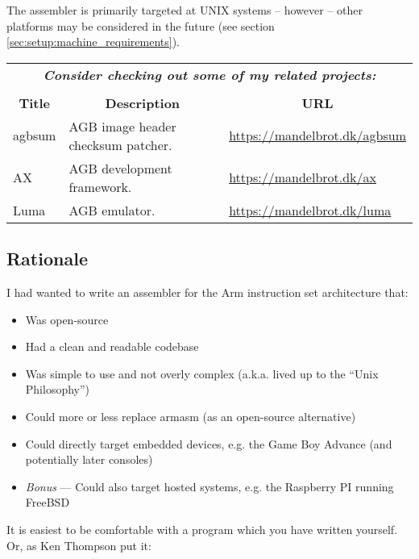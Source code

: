 \documentclass[a4paper]{article}
\begin{document}
		The assembler is primarily targeted at UNIX systems -- however -- other platforms may be considered in the future (see section \ref{sec:setup:machine_requirements}).

		\begin{center}
			\begin{tabular}{|l|l|l|}
				\multicolumn{3}{c}{\itshape\bfseries Consider checking out some of my related projects:} \\
				\multicolumn{3}{c}{} \\
				\hline
				\multicolumn{1}{|c|}{\bfseries Title} & \multicolumn{1}{c|}{\bfseries Description} & \multicolumn{1}{c|}{\bfseries URL} \\
				agbsum & AGB image header checksum patcher. & \url{https://mandelbrot.dk/agbsum} \\
				AX & AGB development framework. & \url{https://mandelbrot.dk/ax} \\
				Luma & AGB emulator. & \url{https://mandelbrot.dk/luma} \\
				\hline
			\end{tabular}
		\end{center}

		\subsection{Rationale}
			\label{sec:rationale}
			I had wanted to write an assembler for the Arm instruction set architecture that:

			\begin{itemize}
				\item Was open-source
				\item Had a clean and readable codebase
				\item Was simple to use and not overly complex (a.k.a. lived up to the ``Unix Philosophy'')
				\item Could more or less replace armasm (as an open-source alternative)
				\item Could directly target embedded devices, e.g. the Game Boy Advance (and potentially later consoles)
				\item \textit{Bonus} --- Could also target hosted systems, e.g. the Raspberry PI running FreeBSD
			\end{itemize}

			It is easiest to be comfortable with a program which you have written yourself.
			Or, as Ken Thompson put it:

			\begin{center}
			\end{center}
\end{document}
